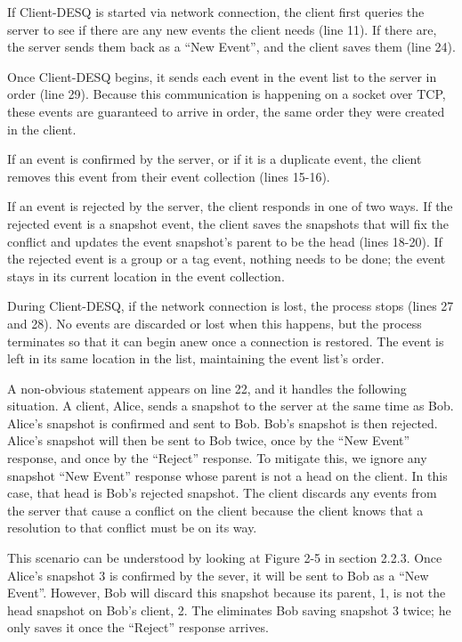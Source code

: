 If Client-DESQ is started via network connection, the client first queries the server to see if there are any new events the client needs (line 11). If there are, the server sends them back as a ``New Event'', and the client saves them (line 24).

Once Client-DESQ begins, it sends each event in the event list to the server in order (line 29). Because this communication is happening on a socket over TCP, these events are guaranteed to arrive in order, the same order they were created in the client.

If an event is confirmed by the server, or if it is a duplicate event, the client removes this event from their event collection (lines 15-16). 

If an event is rejected by the server, the client responds in one of two ways. If the rejected event is a snapshot event, the client saves the snapshots that will fix the conflict and updates the event snapshot's parent to be the head (lines 18-20). If the rejected event is a group or a tag event, nothing needs to be done; the event stays in its current location in the event collection.

During Client-DESQ, if the network connection is lost, the process stops (lines 27 and 28). No events are discarded or lost when this happens, but the process terminates so that it can begin anew once a connection is restored. The event is left in its same location in the list, maintaining the event list's order.

A non-obvious statement appears on line 22, and it handles the following situation. A client, Alice, sends a snapshot to the server at the same time as Bob. Alice's snapshot is confirmed and sent to Bob. Bob's snapshot is then rejected. Alice's snapshot will then be sent to Bob twice, once by the ``New Event'' response, and once by the ``Reject'' response. To mitigate this, we ignore any snapshot ``New Event'' response whose parent is not a head on the client. In this case, that head is Bob's rejected snapshot. The client discards any events from the server that cause a conflict on the client because the client knows that a resolution to that conflict must be on its way.

This scenario can be understood by looking at Figure 2-5 in section 2.2.3. Once Alice's snapshot 3 is confirmed by the sever, it will be sent to Bob as a ``New Event''. However, Bob will discard this snapshot because its parent, 1, is not the head snapshot on Bob's client, 2. The eliminates Bob saving snapshot 3 twice; he only saves it once the ``Reject'' response arrives.

